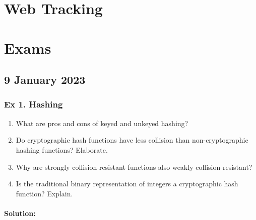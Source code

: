 	\newpage
	\section{Web Tracking}	
		
	\newpage
	\section{Exams}	
	\subsection{9 January 2023}	
	\subsubsection{Ex 1. Hashing}	
	\begin{enumerate}
	\item 	What are pros and cons of keyed and unkeyed hashing?
	\item 	Do cryptographic hash functions have less collision than non-cryptographic hashing functions? Elaborate.
	\item 	Why are strongly collision-resistant functions also weakly collision-resistant? 
	\item 	Is the traditional binary representation of integers a cryptographic hash function? Explain.
	\end{enumerate}
	
	\paragraph{Solution:}
	
